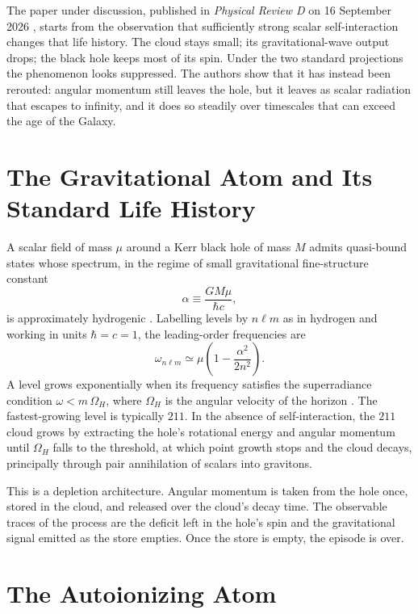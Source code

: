 \documentclass[11pt]{article}
\begin{document}
The paper under discussion, published in \emph{Physical Review D} on 16 September 2026 \cite{GavilanMartin2026}, starts from the observation that sufficiently strong scalar self-interaction changes that life history. The cloud stays small; its gravitational-wave output drops; the black hole keeps most of its spin. Under the two standard projections the phenomenon looks suppressed. The authors show that it has instead been rerouted: angular momentum still leaves the hole, but it leaves as scalar radiation that escapes to infinity, and it does so steadily over timescales that can exceed the age of the Galaxy.

\section{The Gravitational Atom and Its Standard Life History}

A scalar field of mass $\mu$ around a Kerr black hole of mass $M$ admits quasi-bound states whose spectrum, in the regime of small gravitational fine-structure constant
\begin{equation}
\alpha \equiv \frac{G M \mu}{\hbar c},
\end{equation}
is approximately hydrogenic \cite{Detweiler1980,BaumannChiaPorto2019}. Labelling levels by $n\ell m$ as in hydrogen and working in units $\hbar=c=1$, the leading-order frequencies are
\begin{equation}
\omega_{n\ell m} \simeq \mu\left(1 - \frac{\alpha^{2}}{2n^{2}}\right).
\label{eq:levels}
\end{equation}
A level grows exponentially when its frequency satisfies the superradiance condition $\omega < m\,\Omega_{H}$, where $\Omega_{H}$ is the angular velocity of the horizon \cite{Zeldovich1971,PressTeukolsky1972,BritoCardosoPani2015}. The fastest-growing level is typically $211$. In the absence of self-interaction, the $211$ cloud grows by extracting the hole's rotational energy and angular momentum until $\Omega_{H}$ falls to the threshold, at which point growth stops and the cloud decays, principally through pair annihilation of scalars into gravitons.

This is a depletion architecture. Angular momentum is taken from the hole once, stored in the cloud, and released over the cloud's decay time. The observable traces of the process are the deficit left in the hole's spin and the gravitational signal emitted as the store empties. Once the store is empty, the episode is over.

\section{The Autoionizing Atom}
\end{document}
